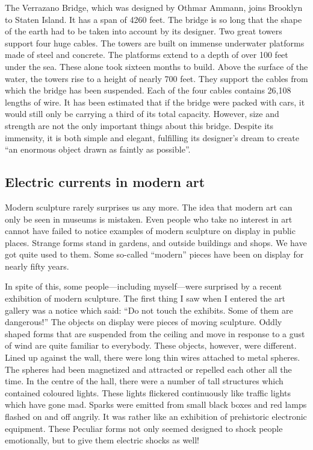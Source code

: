 \documentclass[11pt]{article}
\begin{document}
The Verrazano Bridge, which was designed by Othmar Ammann, joins Brooklyn to Staten Island. It has a span of 4260 feet. The bridge is so long that the shape of the earth had to be taken into account by its designer. Two great towers support four huge cables. The towers are built on immense underwater platforms made of steel and concrete. The platforms extend to a depth of over 100 feet under the sea. These alone took sixteen months to build. Above the surface of the water, the towers rise to a height of nearly 700 feet. They support the cables from which the bridge has been suspended. Each of the four cables contains 26,108 lengths of wire. It has been estimated that if the bridge were packed with cars, it would still only be carrying a third of its total capacity. However, size and strength are not the only important things about this bridge. Despite its immensity, it is both simple and elegant, fulfilling its designer's dream to create ``an enormous object drawn as faintly as possible''. 
\subsection{Electric currents in modern art}
\label{sec-1-18}

Modern sculpture rarely surprises us any more. The idea that modern art can only be seen in museums is mistaken. Even people who take no interest in art cannot have failed to notice examples of modern sculpture on display in public places. Strange forms stand in gardens, and outside buildings and shops. We have got quite used to them. Some so-called ``modern'' pieces have been on display for nearly fifty years. 

In spite of this, some people---including myself---were surprised by a recent exhibition of modern sculpture. The first thing I saw when I entered the art gallery was a notice which said: ``Do not touch the exhibits. Some of them are dangerous!'' The objects on display were pieces of moving sculpture. Oddly shaped forms that are suspended from the ceiling and move in response to a gust of wind are quite familiar to everybody. These objects, however, were different. Lined up against the wall, there were long thin wires attached to metal spheres. The spheres had been magnetized and attracted or repelled each other all the time. In the centre of the hall, there were a number of tall structures which contained coloured lights. These lights flickered continuously like traffic lights which have gone mad. Sparks were emitted from small black boxes and red lamps flashed on and off angrily. It was rather like an exhibition of prehistoric electronic equipment. These Peculiar forms not only seemed designed to shock people emotionally, but to give them electric shocks as well! 
\end{document}
